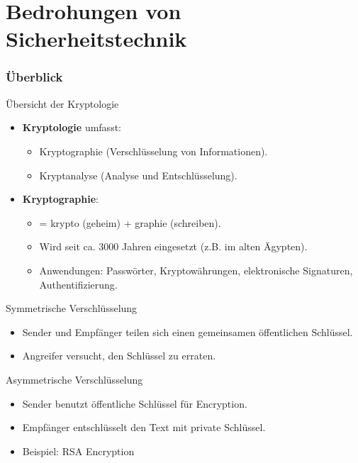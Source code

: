 \documentclass{beamer}
\begin{document}
    \section{Bedrohungen von Sicherheitstechnik}

    \begin{frame}
        \frametitle{Überblick}
        \tableofcontents
    \end{frame}

    \begin{frame}{Übersicht der Kryptologie}
        \begin{itemize}
            \item \textbf{Kryptologie} umfasst:
            \begin{itemize}
                \item Kryptographie (Verschlüsselung von Informationen).
                \item Kryptanalyse (Analyse und Entschlüsselung).
            \end{itemize}
            \item \textbf{Kryptographie}:
            \begin{itemize}
                \item = krypto (geheim) + graphie (schreiben).
                \item Wird seit ca. 3000 Jahren eingesetzt (z.B. im alten Ägypten).
                \item Anwendungen: Passwörter, Kryptowährungen, elektronische Signaturen, Authentifizierung.
            \end{itemize}
        \end{itemize}
    \end{frame}

    \begin{frame}{Symmetrische Verschlüsselung}
        \begin{itemize}
            \item  Sender und Empfänger teilen sich einen gemeinsamen öffentlichen Schlüssel.
            \item Angreifer versucht, den Schlüssel zu erraten.
        \end{itemize}
    \end{frame}

    \begin{frame}{Asymmetrische Verschlüsselung}
        \begin{itemize}
            \item Sender benutzt öffentliche Schlüssel für Encryption.
            \item Empfänger entschlüsselt den Text mit private Schlüssel.
            \item Beispiel: RSA Encryption
        \end{itemize}
    \end{frame}
\end{document}
